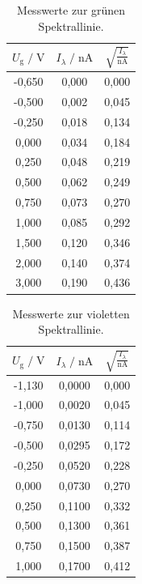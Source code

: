 \begin{table}
    \centering
    \caption{Messwerte zur grünen Spektrallinie.}
    \label{tab:gruen}
    \begin{tabular}{c c c}
    \toprule
    $ U_\text{g} \;/\; \si{\volt} $ & $I_\lambda \;/\; \si{\nano\ampere}$ &
    $ \sqrt{\frac{I_\lambda}{\si{\nano\ampere}}}$\\
    \midrule 
       -0,650 & 0,000 & 0,000\\   
       -0,500 & 0,002 & 0,045\\  
       -0,250 & 0,018 & 0,134\\  
        0,000 & 0,034 & 0,184\\ 
        0,250 & 0,048 & 0,219\\  
        0,500 & 0,062 & 0,249\\
        0,750 & 0,073 & 0,270\\  
        1,000 & 0,085 & 0,292\\  
        1,500 & 0,120 & 0,346\\ 
        2,000 & 0,140 & 0,374\\ 
        3,000 & 0,190 & 0,436\\       
    \bottomrule
    \end{tabular}
\end{table}

\begin{table}
    \centering
    \caption{Messwerte zur violetten Spektrallinie.}
    \label{tab:viol}
    \begin{tabular}{c c c}
    \toprule
    $ U_\text{g} \;/\; \si{\volt} $ & $I_\lambda \;/\; \si{\nano\ampere}$ &
    $ \sqrt{\frac{I_\lambda}{\si{\nano\ampere}}}$\\
    \midrule 
      -1,130 & 0,0000 & 0,000\\
      -1,000 & 0,0020 & 0,045\\
      -0,750 & 0,0130 & 0,114\\
      -0,500 & 0,0295 & 0,172\\
      -0,250 & 0,0520 & 0,228\\
       0,000 & 0,0730 & 0,270\\
       0,250 & 0,1100 & 0,332\\
       0,500 & 0,1300 & 0,361\\
       0,750 & 0,1500 & 0,387\\
       1,000 & 0,1700 & 0,412\\     
    \bottomrule
    \end{tabular}
\end{table}

